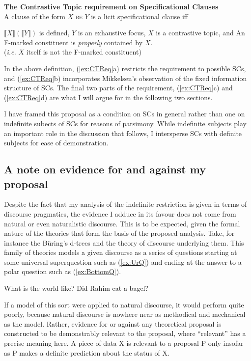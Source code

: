 \documentclass[
]{RCL}
\begin{document}
\begin{exe}
\ex\label{ex:CTReq} \textbf{The Contrastive Topic requirement on Specificational Clauses}\\
A clause of the form $X$ \textsc{be} $Y$ is a licit specificational clause iff
\begin{xlist}
\ex $\llbracket X\rrbracket(\llbracket Y\rrbracket)$ is defined,
\ex $Y$ is an exhaustive focus, \citep{mikkelsen2005copular}
\ex $X$ is a contrastive topic, and
\ex An F-marked constituent is \textit{properly} contained by $X$.\\
(\textit{i.e.} $X$ itself is not the F-marked constituent)
\end{xlist}
\end{exe}

In the above definition, (\ref{ex:CTReq}a) restricts the requirement to possible SCs, and (\ref{ex:CTReq}b) incorporates Mikkelsen's observation of the fixed information structure of SCs.
The final two parts of the requirement, (\ref{ex:CTReq}c) and (\ref{ex:CTReq}d) are what I will argue for in the following two sections.

I have framed this proposal as a condition on SCs in general rather than one on indefinite subects of SCs for reasons of parsimony.
While indefinite subjects play an important role in the discussion that follows, I intersperse SCs with definite subjects for ease of demonstration.

\subsection{A note on evidence for and against my proposal}
Despite the fact that my analysis of the indefinite restriction is given in terms of discourse pragmatics, the evidence I adduce in its favour does not come from natural or even naturalistic discourse.
This is to be expected, given the formal nature of the theories that form the basis of the proposed analysis.
Take, for instance the B\"uring's d-trees and the theory of discourse underlying them.
This family of theories models a given discourse as a series of questions starting at some universal superquestion such as (\ref{ex:UrQ}) and ending at the answer to a polar question such as (\ref{ex:BottomQ}).
\begin{exe}
	\ex\label{ex:UrQ} What is the world like?
	\ex\label{ex:BottomQ} Did Rahim eat a bagel?
\end{exe}
If a model of this sort were applied to natural discourse, it would perform quite poorly, because natural discourse is nowhere near as methodical and mechanical as the model.
Rather, evidence for or against any theoretical proposal is constructed to be demonstrably relevant to the proposal, where ``relevant'' has a precise meaning here.
A piece of data X is relevant to a proposal P only insofar as P makes a definite prediction about the status of X.
\end{document}
